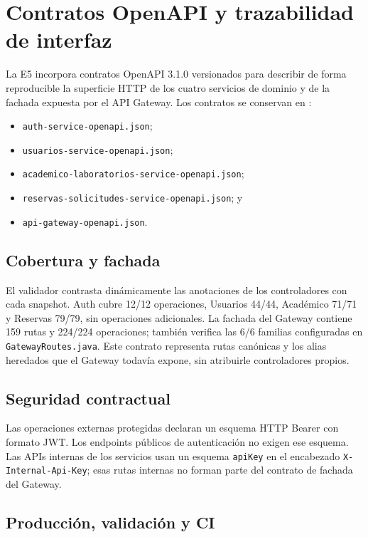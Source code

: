 \section{Contratos OpenAPI y trazabilidad de interfaz}
\label{sec:contratos-openapi}

La E5 incorpora contratos OpenAPI 3.1.0 versionados para describir de forma
reproducible la superficie HTTP de los cuatro servicios de dominio y de la
fachada expuesta por el API Gateway. Los contratos se conservan en
:

\begin{itemize}
  \item \texttt{auth-service-openapi.json};
  \item \texttt{usuarios-service-openapi.json};
  \item \texttt{academico-laboratorios-service-openapi.json};
  \item \texttt{reservas-solicitudes-service-openapi.json}; y
  \item \texttt{api-gateway-openapi.json}.
\end{itemize}

\subsection{Cobertura y fachada}

El validador contrasta dinámicamente las anotaciones de los controladores con
cada snapshot. Auth cubre 12/12 operaciones, Usuarios 44/44, Académico 71/71
y Reservas 79/79, sin operaciones adicionales. La fachada del Gateway contiene
159 rutas y 224/224 operaciones; también verifica las 6/6 familias configuradas
en \texttt{GatewayRoutes.java}. Este contrato representa rutas canónicas y los
alias heredados que el Gateway todavía expone, sin atribuirle controladores
propios.

\subsection{Seguridad contractual}

Las operaciones externas protegidas declaran un esquema HTTP Bearer con formato
JWT. Los endpoints públicos de autenticación no exigen ese esquema. Las APIs
internas de los servicios usan un esquema \texttt{apiKey} en el encabezado
\texttt{X-Internal-Api-Key}; esas rutas internas no forman parte del contrato de
fachada del Gateway.

\subsection{Producción, validación y CI}

